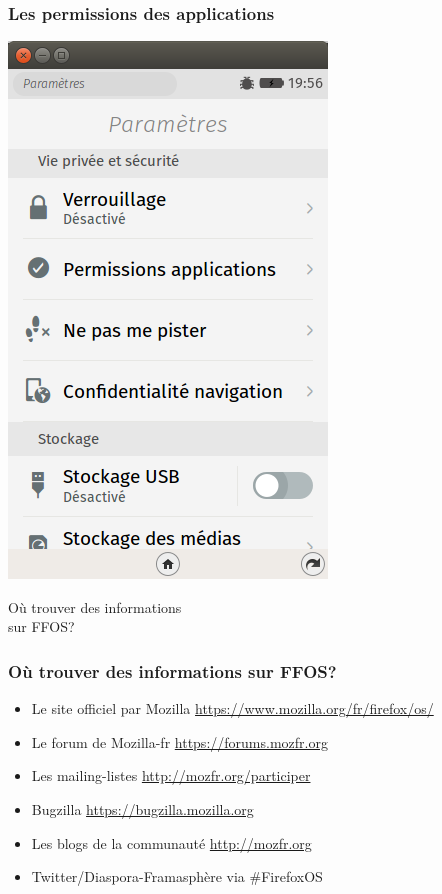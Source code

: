 \documentclass{beamer}
\begin{document}
\begin{frame}
\frametitle{Les permissions des applications}
\begin{center}
\includegraphics[scale=0.3]{./images/Screenshot01.png}
\end{center}
\end{frame}
\begin{frame}
\begin{center}
\Huge{Où trouver des informations \\ sur FFOS?}
\end{center}
\end{frame}
\begin{frame}
\frametitle{Où trouver des informations sur FFOS?}
\begin{itemize}
\item Le site officiel par Mozilla \url{https://www.mozilla.org/fr/firefox/os/}
\item Le forum de Mozilla-fr \url{https://forums.mozfr.org}
\item Les mailing-listes \url{http://mozfr.org/participer}
\item Bugzilla \url{https://bugzilla.mozilla.org}
\item Les blogs de la communauté \url{http://mozfr.org}
\item Twitter/Diaspora-Framasphère via \#FirefoxOS
\end{itemize}
\end{frame}
\end{document}
